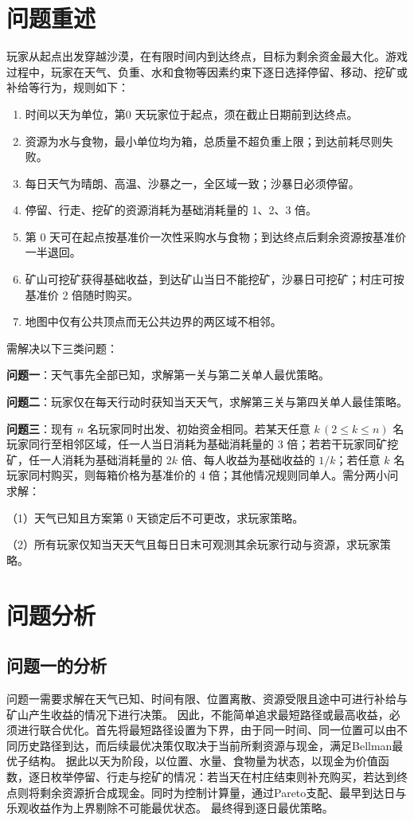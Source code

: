 \documentclass{cumcmthesis}
\numberwithin{equation}{section}
\numberwithin{figure}{section}
\numberwithin{table}{section}
\begin{document}
\section{问题重述}

玩家从起点出发穿越沙漠，在有限时间内到达终点，目标为剩余资金最大化。游戏过程中，玩家在天气、负重、水和食物等因素约束下逐日选择停留、移动、挖矿或补给等行为，规则如下：

\begin{enumerate}[leftmargin=2em,itemsep=2pt]
    \item 时间以天为单位，第0 天玩家位于起点，须在截止日期前到达终点。
    \item 资源为水与食物，最小单位均为箱，总质量不超负重上限；到达前耗尽则失败。
    \item 每日天气为晴朗、高温、沙暴之一，全区域一致；沙暴日必须停留。
    \item 停留、行走、挖矿的资源消耗为基础消耗量的 1、2、3 倍。
    \item 第 0 天可在起点按基准价一次性采购水与食物；到达终点后剩余资源按基准价一半退回。
    \item 矿山可挖矿获得基础收益，到达矿山当日不能挖矿，沙暴日可挖矿；村庄可按基准价 2 倍随时购买。
    \item 地图中仅有公共顶点而无公共边界的两区域不相邻。
\end{enumerate}

需解决以下三类问题：

\textbf{问题一}：天气事先全部已知，求解第一关与第二关单人最优策略。

\textbf{问题二}：玩家仅在每天行动时获知当天天气，求解第三关与第四关单人最佳策略。

\textbf{问题三}：现有 $n$ 名玩家同时出发、初始资金相同。若某天任意 $k\,(2\le k\le n)$ 名玩家同行至相邻区域，任一人当日消耗为基础消耗量的 3 倍；若若干玩家同矿挖矿，任一人消耗为基础消耗量的 $2k$ 倍、每人收益为基础收益的 $1/k$；若任意 $k$ 名玩家同村购买，则每箱价格为基准价的 4 倍；其他情况规则同单人。需分两小问求解：

（1）天气已知且方案第 0 天锁定后不可更改，求玩家策略。

（2）所有玩家仅知当天天气且每日日末可观测其余玩家行动与资源，求玩家策略。

\section{问题分析}

        
        \subsection{问题一的分析}
        问题一需要求解在天气已知、时间有限、位置离散、资源受限且途中可进行补给与矿山产生收益的情况下进行决策。
        因此，不能简单追求最短路径或最高收益，必须进行联合优化。首先将最短路径设置为下界，由于同一时间、同一位置可以由不同历史路径到达，而后续最优决策仅取决于当前所剩资源与现金，满足Bellman最优子结构。
        据此以天为阶段，以位置、水量、食物量为状态，以现金为价值函数，逐日枚举停留、行走与挖矿的情况：若当天在村庄结束则补充购买，若达到终点则将剩余资源折合成现金。同时为控制计算量，通过Pareto支配、最早到达日与乐观收益作为上界剔除不可能最优状态。
        最终得到逐日最优策略。
\end{document}
